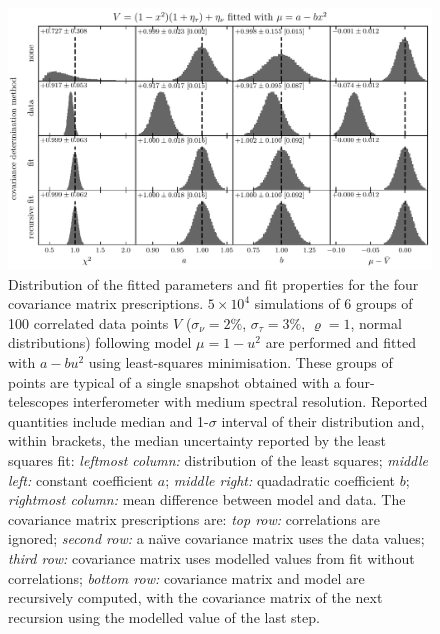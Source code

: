 \documentclass[twocolumn]{article}
\def\norm{_\tau}
\def\meas{_\nu}
\def\data{\ensuremath{{\scriptstyle V}}}
\def\mod{\ensuremath{\mu}}
\def\dev{\ensuremath{\sigma}}
\def\reldev{\ensuremath{\dev\norm}}
\def\absdev{\ensuremath{\dev\meas}}
\def\corr{\ensuremath{\varrho}}
\begin{document}
\begin{figure}[t]
\centering
\includegraphics[width=\linewidth]{pdf/fit-quality.pdf}
\caption{Distribution of the fitted parameters and fit properties for the four covariance matrix prescriptions. $5\times10^4$ simulations of 6 groups of 100 correlated data points $\data$ ($\absdev = 2\%$, $\reldev = 3\%$, $\corr = 1$, normal distributions) following model $\mod = 1-u^2$ are performed and fitted with $a - bu^2$ using least-squares minimisation. These groups of points are typical of a single snapshot obtained with a four-telescopes interferometer with medium spectral resolution. Reported quantities include median and 1-$\sigma$ interval of their distribution and, within brackets, the median uncertainty reported by the least squares fit: \emph{leftmost column:} distribution of the least squares; \emph{middle left:} constant coefficient $a$; \emph{middle right:} quadadratic coefficient $b$; \emph{rightmost column:} mean difference between model and data. The covariance matrix prescriptions are: \emph{top row:} correlations are ignored; \emph{second row:} a na\"\i{}ve covariance matrix uses the data values; \emph{third row:} covariance matrix uses modelled values from fit without correlations; \emph{bottom row:} covariance matrix and model are recursively computed, with the covariance matrix of the next recursion using the modelled value of the last step.}
\end{figure}
\end{document}
